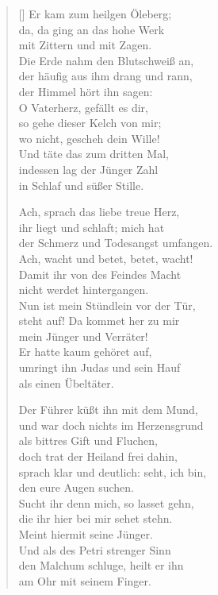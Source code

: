 \begin{multicols}{2}
\begin{verse}[\versewidth]
 Er kam zum heilgen Öleberg;\\
da, da ging an das hohe Werk\\
mit Zittern und mit Zagen.\\
Die Erde nahm den Blutschweiß an,\\
der häufig aus ihm drang und rann,\\
der Himmel hört ihn sagen:\\
O Vaterherz, gefällt es dir,\\
so gehe dieser Kelch von mir;\\
wo nicht, gescheh dein Wille!\\
Und täte das zum dritten Mal,\\
indessen lag der Jünger Zahl\\
in Schlaf und süßer Stille.

 Ach, sprach das liebe treue Herz,\\
ihr liegt und schlaft; mich hat\\
der Schmerz und Todesangst umfangen.\\
Ach, wacht und betet, betet, wacht!\\
Damit ihr von des Feindes Macht\\
nicht werdet hintergangen.\\
Nun ist mein Stündlein vor der Tür,\\
steht auf! Da kommet her zu mir\\
mein Jünger und Verräter!\\
Er hatte kaum gehöret auf,\\
umringt ihn Judas und sein Hauf\\
als einen Übeltäter.

 Der Führer küßt ihn mit dem Mund,\\
und war doch nichts im Herzensgrund\\
als bittres Gift und Fluchen,\\
doch trat der Heiland frei dahin,\\
sprach klar und deutlich: seht, ich bin,\\
den eure Augen suchen.\\
Sucht ihr denn mich, so lasset gehn,\\
die ihr hier bei mir sehet stehn.\\
Meint hiermit seine Jünger.\\
Und als des Petri strenger Sinn\\
den Malchum schluge, heilt er ihn\\
am Ohr mit seinem Finger.


\end{verse}
\end{multicols}
